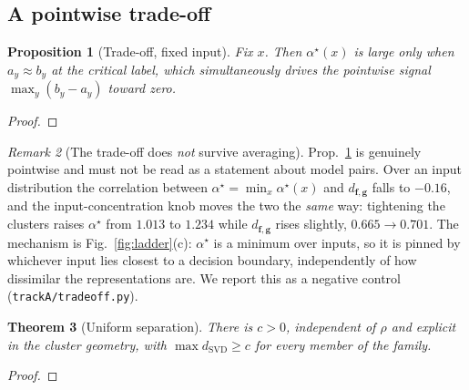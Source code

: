 \documentclass[10pt,letterpaper,twocolumn]{article}
\newcommand{\TODO}[1]{}
\newcommand{\GATE}[1]{\textcolor{blue}{\textsf{\scriptsize (#1)}}}
\newcommand{\DONE}[1]{}
\newcommand{\bff}{\mathbf{f}}
\newcommand{\bfg}{\mathbf{g}}
\newcommand{\dSVD}{d_{\mathrm{SVD}}}
\newcommand{\dfg}{d_{\bff,\bfg}}
\theoremstyle{plain}
\newtheorem{theorem}{Theorem}
\newtheorem{proposition}[theorem]{Proposition}
\theoremstyle{definition}
\theoremstyle{remark}
\newtheorem{remark}[theorem]{Remark}
\begin{document}
\subsection{A pointwise trade-off}

\begin{proposition}[Trade-off, fixed input]
\label{prop:tradeoff}
Fix $x$. Then $\alpha^{\star}(x)$ is large only when $a_{y}\approx b_{y}$ at the
critical label, which simultaneously drives the pointwise signal
$\max_{y}(b_{y}-a_{y})$ toward zero.
\end{proposition}

\begin{proof}
\TODO{[O1b] Quantify: lower-bound $\max_{y}(b_{y}-a_{y})$ by a decreasing
function of $\alpha^{\star}(x)$. \GATE{G2}}
\end{proof}

\DONE{Pointwise: $r=-0.58$ over $531$ geometries; mean signal $0.89$ in the top
$\alpha^{\star}$ quintile against $1.60$ in the bottom.}

\begin{remark}[The trade-off does \emph{not} survive averaging]
\label{rem:noavg}
Prop.~\ref{prop:tradeoff} is genuinely pointwise and must not be read as a
statement about model pairs. Over an input distribution the correlation between
$\alpha^{\star}=\min_{x}\alpha^{\star}(x)$ and $\dfg$ falls to $-0.16$, and the
input-concentration knob moves the two the \emph{same} way: tightening the
clusters raises $\alpha^{\star}$ from $1.013$ to $1.234$ while $\dfg$ rises
slightly, $0.665\to0.701$. The mechanism is Fig.~\ref{fig:ladder}(c):
$\alpha^{\star}$ is a minimum over inputs, so it is pinned by whichever input
lies closest to a decision boundary, independently of how dissimilar the
representations are. We report this as a negative control
(\texttt{trackA/tradeoff.py}).
\end{remark}

\begin{theorem}[Uniform separation]
\label{thm:lower}
There is $c>0$, independent of $\rho$ and explicit in the cluster geometry, with
$\max\dSVD\ge c$ for every member of the family.
\end{theorem}
\begin{proof}
\TODO{[O3] The rotation is explicit ($\pi/2$ in the first two coordinates), so
the cross-covariance singular values are available in closed form. Upgrades
``not linearly equivalent'' to ``quantitatively far''. \GATE{G2}}
\end{proof}
\end{document}
